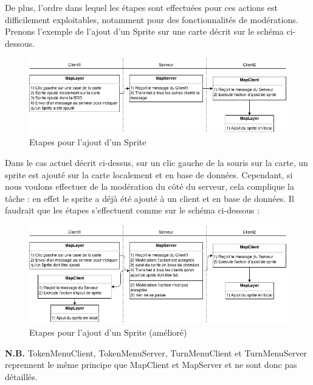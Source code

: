 De plus, l'ordre dans lequel les étapes sont effectuées pour ces actions est difficilement exploitables, notamment pour des fonctionnalités de modérations. Prenons l'exemple de l'ajout d'un Sprite sur une carte décrit sur le schéma ci-dessous.

\begin{figure}[h!]
	\centering
	\includegraphics[width=1.0\textwidth]{img/network_addsprite.png}
	\caption{Etapes pour l'ajout d'un Sprite}
\end{figure}

Dans le cas actuel décrit ci-dessus, sur un clic gauche de la souris sur la carte, un sprite est ajouté sur la carte localement et en base de données. Cependant, si nous voulons effectuer de la modération du côté du serveur, cela complique la tâche : en effet le sprite a déjà été ajouté à un client et en base de données. Il faudrait que les étapes s'effectuent comme sur le schéma ci-dessous :

\begin{figure}[h!]
	\centering
	\includegraphics[width=1.0\textwidth]{img/network_addsprite_better.png}
	\caption{Etapes pour l'ajout d'un Sprite (amélioré)}
\end{figure}

\textbf{N.B.} TokenMenuClient, TokenMenuServer, TurnMenuClient et TurnMenuServer reprennent le même principe que MapClient et MapServer et ne sont donc pas détaillés.

